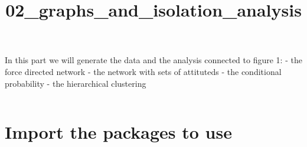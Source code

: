 \documentclass[11pt]{article}
\title{02\_graphs\_and\_isolation\_analysis}
\makeatletter
\newcommand{\boxspacing}{\kern\kvtcb@left@rule\kern\kvtcb@boxsep}
\newcommand{\prompt}[4]{
        {\ttfamily\llap{{\color{#2}[#3]:\hspace{3pt}#4}}\vspace{-\baselineskip}}
    }
\makeatother
\begin{document}
    
    \maketitle
    
    

    
    In this part we will generate the data and the analysis connected to
figure 1: - the force directed network - the network with sets of
attituteds - the conditional probability - the hierarchical clustering

    \begin{tcolorbox}[breakable, size=fbox, boxrule=1pt, pad at break*=1mm,colback=cellbackground, colframe=cellborder]
\prompt{In}{incolor}{ }{\boxspacing}
\begin{Verbatim}[commandchars=\\\{\}]

\end{Verbatim}
\end{tcolorbox}

    \hypertarget{import-the-packages-to-use}{%
\section{Import the packages to use}\label{import-the-packages-to-use}}
\end{document}
